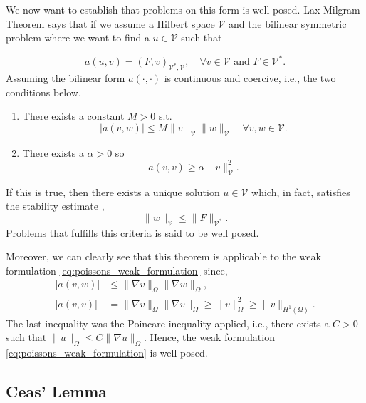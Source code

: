 We now want to establish that problems on this form is well-posed.
Lax-Milgram Theorem says that if we assume a Hilbert space $\mathcal{V} $ and the bilinear symmetric problem where we want to find a $u \in \mathcal{V} $  such that

\begin{equation*}
    a\left( u,v \right)  = \left( F, v \right) _{\mathcal{V} ^{*}, \mathcal{V} }, \quad \forall v \in  \mathcal{V} \text{ and } F \in \mathcal{V} ^{*}
.\end{equation*}
 Assuming the bilinear form $a\left( \cdot ,\cdot  \right) $  is continuous and coercive, i.e., the two conditions below.
\begin{enumerate}[label=\arabic*)]
    \item There exists a constant $M>0$ s.t. \[
    \left\lvert a\left( v,w \right)  \right\rvert \le M \| v \|_{ \mathcal{V}  }^{  } \| w \|_{ \mathcal{V}  }^{  }  \quad \forall v,w \in \mathcal{V}.
    \]
\item There exists a $\alpha  > 0$  so \[
a\left( v,v \right)  \ge  \alpha \| v \|_{ \mathcal{V}  }^{ 2 }.
\]
\end{enumerate}
If this is true, then there exists a unique solution $u \in \mathcal{V} $ which, in fact, satisfies the stability estimate \cite{manzoni2021optimal}, \[
\| w \|_{ \mathcal{V}   }^{  } \le  \| F \|_{ \mathcal{V} ^{*} }^{  }.
\]
Problems that fulfills this criteria is said to be well posed.

Moreover, we can clearly see that this theorem is applicable to the weak formulation \eqref{eq:poissons_weak_formulation} since,
\[
\begin{split}
    \left\lvert a\left( v,w \right)  \right\rvert & \le \| \nabla v \|_{ \Omega  }^{  } \| \nabla w \|_{ \Omega  }^{  }, \\
\left\lvert a\left( v,v \right)  \right\rvert  & = \|  \nabla v\|_{\Omega   }^{  }  \| \nabla v  \|_{\Omega   }^{  } \ge  \| v \|_{ \Omega  }^{ 2 } \ge \| v \|_{ H^{1}\left( \Omega  \right)  }^{  }.
\end{split}
\]
The last inequality was the Poincare inequality applied, i.e., there exists a $C>0$  such that $\| u \|_{ \Omega  }^{  } \le C  \| \nabla u \|_{\Omega   }^{  } $. Hence, the weak formulation \eqref{eq:poissons_weak_formulation} is well posed.

\subsection{Ceas' Lemma}%
\label{sub:ceas_lemma}

